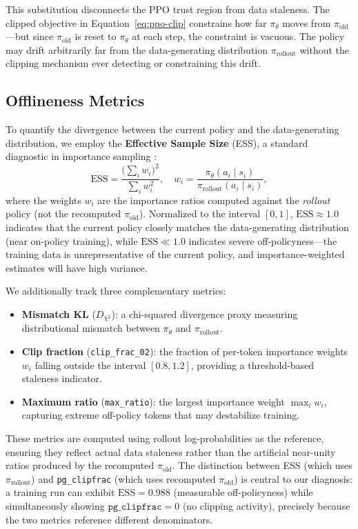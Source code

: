 This substitution disconnects the PPO trust region from data staleness.
The clipped objective in Equation~\ref{eq:ppo-clip} constrains how far $\pi_\theta$ moves from $\pi_{\text{old}}$---but since $\pi_{\text{old}}$ is reset to $\pi_\theta$ at each step, the constraint is vacuous.
The policy may drift arbitrarily far from the data-generating distribution $\pi_{\text{rollout}}$ without the clipping mechanism ever detecting or constraining this drift.


\subsection{Offlineness Metrics}
\label{sec:bg-offlineness}

To quantify the divergence between the current policy and the data-generating distribution, we employ the \textbf{Effective Sample Size} (ESS), a standard diagnostic in importance sampling \citep{kong1992ess,liu2001mc}:
\begin{equation}
\label{eq:ess}
\text{ESS} = \frac{\big(\sum_{i} w_i\big)^2}{\sum_{i} w_i^2}, \quad w_i = \frac{\pi_\theta(a_i \mid s_i)}{\pi_{\text{rollout}}(a_i \mid s_i)},
\end{equation}
where the weights $w_i$ are the importance ratios computed against the \emph{rollout} policy (not the recomputed $\pi_{\text{old}}$).
Normalized to the interval $[0, 1]$, $\text{ESS} \approx 1.0$ indicates that the current policy closely matches the data-generating distribution (near on-policy training), while $\text{ESS} \ll 1.0$ indicates severe off-policyness---the training data is unrepresentative of the current policy, and importance-weighted estimates will have high variance.

We additionally track three complementary metrics:
\begin{itemize}
    \item \textbf{Mismatch KL} ($D_{\chi^2}$): a chi-squared divergence proxy measuring distributional mismatch between $\pi_\theta$ and $\pi_{\text{rollout}}$.
    \item \textbf{Clip fraction} (\texttt{clip\_frac\_02}): the fraction of per-token importance weights $w_i$ falling outside the interval $[0.8, 1.2]$, providing a threshold-based staleness indicator.
    \item \textbf{Maximum ratio} (\texttt{max\_ratio}): the largest importance weight $\max_i w_i$, capturing extreme off-policy tokens that may destabilize training.
\end{itemize}

These metrics are computed using rollout log-probabilities as the reference, ensuring they reflect actual data staleness rather than the artificial near-unity ratios produced by the recomputed $\pi_{\text{old}}$.
The distinction between ESS (which uses $\pi_{\text{rollout}}$) and \texttt{pg\_clipfrac} (which uses recomputed $\pi_{\text{old}}$) is central to our diagnosis: a training run can exhibit $\text{ESS} = 0.988$ (measurable off-policyness) while simultaneously showing $\texttt{pg\_clipfrac} = 0$ (no clipping activity), precisely because the two metrics reference different denominators.
